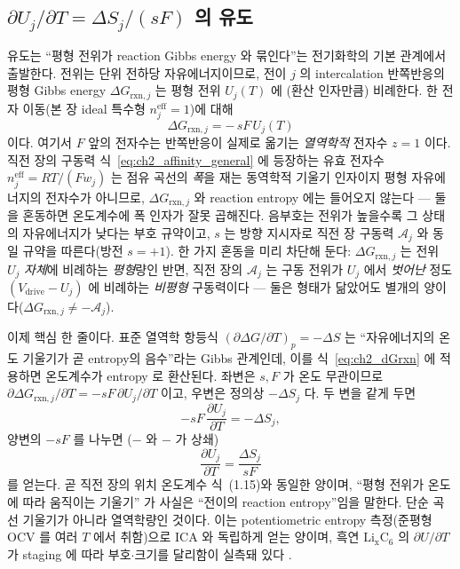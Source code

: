 \documentclass[11pt,a4paper]{article}
\newcommand{\eff}{\mathrm{eff}}
\newcommand{\drive}{\mathrm{drive}}
\newcommand{\rxn}{\mathrm{rxn}}
\begin{document}
\subsection{$\partial U_j/\partial T=\Delta S_j/(sF)$ 의 유도}
유도는 ``평형 전위가 reaction Gibbs energy 와 묶인다''는 전기화학의 기본 관계에서 출발한다. 전위는 단위 전하당
자유에너지이므로, 전이 $j$ 의 intercalation 반쪽반응의 평형 Gibbs energy $\Delta G_{\rxn,j}$ 는 평형 전위 $U_j(T)$
에 (환산 인자만큼) 비례한다. 한 전자 이동(본 장 ideal 특수형 $n_j^{\eff}=1$)에 대해 \cite{bardfaulkner,newman2004}
\begin{equation}
\Delta G_{\rxn,j}=-\,sF\,U_j(T)
\label{eq:ch2_dGrxn}
\end{equation}
이다. 여기서 $F$ 앞의 전자수는 반쪽반응이 실제로 옮기는 \emph{열역학적} 전자수 $z=1$ 이다. 직전 장의 구동력
식~\eqref{eq:ch2_affinity_general} 에 등장하는 유효 전자수 $n_j^{\eff}=RT/(Fw_j)$ 는 점유 곡선의 \emph{폭}을 재는
동역학적 기울기 인자이지 평형 자유에너지의 전자수가 아니므로, $\Delta G_{\rxn,j}$ 와 reaction entropy 에는
들어오지 않는다 — 둘을 혼동하면 온도계수에 폭 인자가 잘못 곱해진다. 음부호는 전위가
높을수록 그 상태의 자유에너지가 낮다는 부호 규약이고, $s$ 는 방향 지시자로 직전 장 구동력 $\mathcal A_j$ 와 동일
규약을 따른다(방전 $s=+1$). 한 가지 혼동을 미리 차단해 둔다: $\Delta G_{\rxn,j}$ 는 전위 $U_j$ \emph{자체}에 비례하는
\emph{평형}량인 반면, 직전 장의 $\mathcal A_j$ 는 구동 전위가 $U_j$ 에서 \emph{벗어난} 정도 $(V_\drive-U_j)$ 에
비례하는 \emph{비평형} 구동력이다 — 둘은 형태가 닮았어도 별개의 양이다($\Delta G_{\rxn,j}\ne-\mathcal A_j$).

이제 핵심 한 줄이다. 표준 열역학 항등식 $(\partial\Delta G/\partial T)_p=-\Delta S$ 는 ``자유에너지의 온도 기울기가
곧 entropy의 음수''라는 Gibbs 관계인데, 이를 식~\eqref{eq:ch2_dGrxn} 에 적용하면 온도계수가 entropy 로 환산된다.
좌변은 $s,F$ 가 온도 무관이므로 $\partial\Delta G_{\rxn,j}/\partial T=-sF\,\partial U_j/\partial T$ 이고, 우변은
정의상 $-\Delta S_j$ 다. 두 변을 같게 두면
\begin{equation}
-sF\,\frac{\partial U_j}{\partial T}=-\Delta S_j,
\label{eq:ch2_GH}
\end{equation}
양변의 $-sF$ 를 나누면 ($-$ 와 $-$ 가 상쇄)
\begin{equation}
\boxed{\;\frac{\partial U_j}{\partial T}=\frac{\Delta S_j}{sF}\;}
\label{eq:ch2_entropy_coeff}
\end{equation}
를 얻는다. 곧 직전 장의 위치 온도계수 식~(1.15)와 동일한 양이며, ``평형 전위가 온도에 따라 움직이는 기울기'' 가
사실은 ``전이의 reaction entropy''임을 말한다. 단순 곡선 기울기가 아니라 열역학량인 것이다. 이는
potentiometric entropy 측정(준평형 OCV 를 여러 $T$ 에서 취함)으로 ICA 와 독립하게 얻는 양이며, 흑연
$\mathrm{Li_xC_6}$ 의 $\partial U/\partial T$ 가 staging 에 따라 부호$\cdot$크기를 달리함이 실측돼 있다
\cite{reynier2004,thomasnewman2003}.
\end{document}

